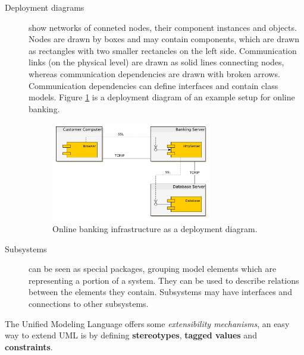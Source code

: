 \documentclass{acmtog} %
\begin{document}
\begin{description}
	\item[Deployment diagrams] show networks of conneted nodes, their component instances and objects.
	Nodes are drawn by boxes and may contain components, which are drawn as rectangles with two smaller rectancles on the left side.
	Communication links (on the physical level) are drawn as solid lines connecting nodes, whereas communication dependencies are drawn with broken arrows.
	Communication dependencies can define interfaces and contain class models.
	Figure \ref{fig:deployment-diagram} is a deployment diagram of an example setup for online banking.
	\begin{figure}[ht]
		\centerline{\includegraphics[width=7cm]{img/uml-banking/deployment-diagram}}
		\caption{Online banking infrastructure as a deployment diagram.}
		\label{fig:deployment-diagram}
	\end{figure}

	\item[Subsystems] can be seen as special packages, grouping model elements which are representing a portion of a system.
	They can be used to describe relations between the elements they contain.
	Subsystems may have interfaces and connections to other subsystems.
\end{description}

The Unified Modeling Language offers some \textit{extensibility mechanisms}, an easy way to extend UML is by defining \textbf{stereotypes}, \textbf{tagged values} and \textbf{constraints}.
\end{document}
